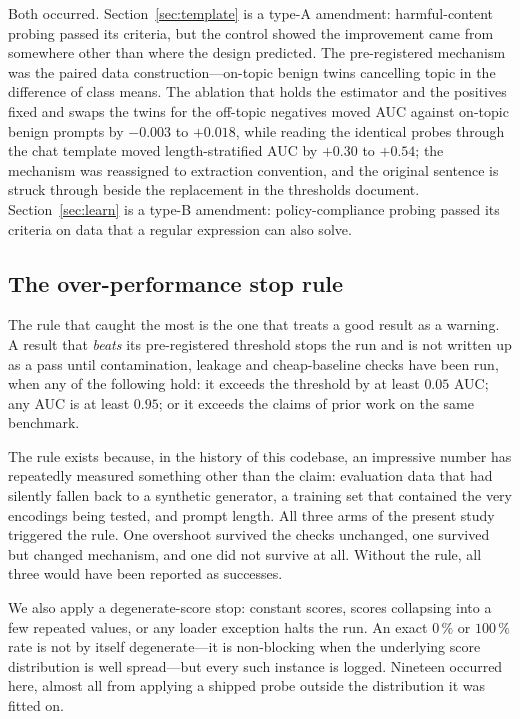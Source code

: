 Both occurred. Section~\ref{sec:template} is a type-A amendment: harmful-content probing passed its criteria, but the
control showed the improvement came from somewhere other than where the design predicted. The pre-registered mechanism
was the paired data construction---on-topic benign twins cancelling topic in the difference of class means. The
ablation that holds the estimator and the positives fixed and swaps the twins for the off-topic negatives moved AUC
against on-topic benign prompts by $-0.003$ to $+0.018$, while reading the identical probes through the chat template
moved length-stratified AUC by $+0.30$ to $+0.54$; the mechanism was reassigned to extraction convention, and the
original sentence is struck through beside the replacement in the thresholds document. Section~\ref{sec:learn} is a
type-B amendment: policy-compliance probing passed its criteria on data that a regular expression can also solve.

\subsection{The over-performance stop rule}
\label{sec:stoprule}

The rule that caught the most is the one that treats a good result as a warning. A result that \emph{beats} its
pre-registered threshold stops the run and is not written up as a pass until contamination, leakage and cheap-baseline
checks have been run, when any of the following hold: it exceeds the threshold by at least $0.05$ AUC; any AUC is at
least $0.95$; or it exceeds the claims of prior work on the same benchmark.

The rule exists because, in the history of this codebase, an impressive number has repeatedly measured something other
than the claim: evaluation data that had silently fallen back to a synthetic generator, a training set that contained
the very encodings being tested, and prompt length. All three arms of the present study triggered the rule. One
overshoot survived the checks unchanged, one survived but changed mechanism, and one did not survive at all. Without
the rule, all three would have been reported as successes.

We also apply a degenerate-score stop: constant scores, scores collapsing into a few repeated values, or any loader
exception halts the run. An exact $0\,\%$ or $100\,\%$ rate is not by itself degenerate---it is non-blocking when the
underlying score distribution is well spread---but every such instance is logged. Nineteen occurred here, almost all
from applying a shipped probe outside the distribution it was fitted on.

